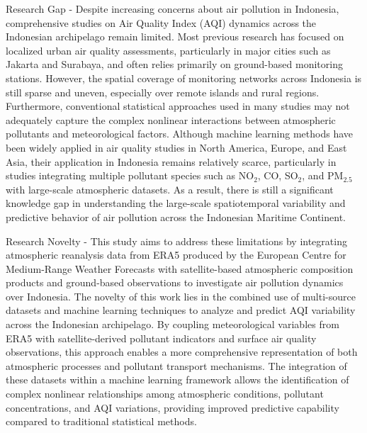 \documentclass[pdflatex,sn-mathphys-num]{sn-jnl}%
\theoremstyle{thmstyleone}%
\theoremstyle{thmstyletwo}%
\theoremstyle{thmstylethree}%
\begin{document}
Research Gap - Despite increasing concerns about air pollution in Indonesia, comprehensive studies on Air Quality Index (AQI) dynamics across the Indonesian archipelago remain limited. Most previous research has focused on localized urban air quality assessments, particularly in major cities such as Jakarta and Surabaya, and often relies primarily on ground-based monitoring stations. However, the spatial coverage of monitoring networks across Indonesia is still sparse and uneven, especially over remote islands and rural regions. Furthermore, conventional statistical approaches used in many studies may not adequately capture the complex nonlinear interactions between atmospheric pollutants and meteorological factors. Although machine learning methods have been widely applied in air quality studies in North America, Europe, and East Asia, their application in Indonesia remains relatively scarce, particularly in studies integrating multiple pollutant species such as NO$_2$, CO, SO$_2$, and PM$_{2.5}$ with large-scale atmospheric datasets. As a result, there is still a significant knowledge gap in understanding the large-scale spatiotemporal variability and predictive behavior of air pollution across the Indonesian Maritime Continent.

Research Novelty - This study aims to address these limitations by integrating atmospheric reanalysis data from ERA5 produced by the European Centre for Medium-Range Weather Forecasts with satellite-based atmospheric composition products and ground-based observations to investigate air pollution dynamics over Indonesia. The novelty of this work lies in the combined use of multi-source datasets and machine learning techniques to analyze and predict AQI variability across the Indonesian archipelago. By coupling meteorological variables from ERA5 with satellite-derived pollutant indicators and surface air quality observations, this approach enables a more comprehensive representation of both atmospheric processes and pollutant transport mechanisms. The integration of these datasets within a machine learning framework allows the identification of complex nonlinear relationships among atmospheric conditions, pollutant concentrations, and AQI variations, providing improved predictive capability compared to traditional statistical methods.
\end{document}
